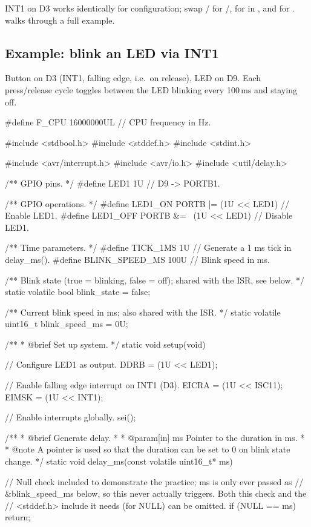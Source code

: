 INT1 on D3 works identically for configuration; swap / for
/,  for  in , and  for
.  walks through a full example.

\subsection{Example: blink an LED via INT1}
\label{c3:a:4}
Button on D3 (INT1, falling edge, i.e.\ on release), LED on D9. Each press/release cycle toggles
between the LED blinking every 100\,ms and staying off.


\begin{ccode}
#define F_CPU 16000000UL // CPU frequency in Hz.

#include <stdbool.h>
#include <stddef.h>
#include <stdint.h>

#include <avr/interrupt.h>
#include <avr/io.h>
#include <util/delay.h>

/** GPIO pins. */
#define LED1 1U // D9 -> PORTB1.

/** GPIO operations. */
#define LED1_ON PORTB |= (1U << LED1)   // Enable LED1.
#define LED1_OFF PORTB &= ~(1U << LED1) // Disable LED1.

/** Time parameters. */
#define TICK_1MS 1U         // Generate a 1 ms tick in delay_ms().
#define BLINK_SPEED_MS 100U // Blink speed in ms.

/** Blink state (true = blinking, false = off); shared with the ISR, see below. */
static volatile bool blink_state = false;

/** Current blink speed in ms; also shared with the ISR. */
static volatile uint16_t blink_speed_ms = 0U;

/**
 * @brief Set up system.
 */
static void setup(void)
{
    // Configure LED1 as output.
    DDRB = (1U << LED1);

    // Enable falling edge interrupt on INT1 (D3).
    EICRA = (1U << ISC11);
    EIMSK = (1U << INT1);

    // Enable interrupts globally.
    sei();
}

/**
 * @brief Generate delay.
 *
 * @param[in] ms Pointer to the duration in ms.
 *
 * @note A pointer is used so that the duration can be set to 0 on blink state change.
 */
static void delay_ms(const volatile uint16_t* ms)
{
    // Null check included to demonstrate the practice; ms is only ever passed as
    // &blink_speed_ms below, so this never actually triggers. Both this check and the
    // <stddef.h> include it needs (for NULL) can be omitted.
    if (NULL == ms) { return; }

}
\end{ccode}
